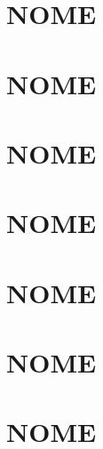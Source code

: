 \documentclass[12pt]{article}
\begin{document}

\section{NOME}
\large



\section{NOME}
\large



\section{NOME}
\large



\section{NOME}
\large



\section{NOME}
\large



\section{NOME}
\large



\section{NOME}
\large
\end{document}
